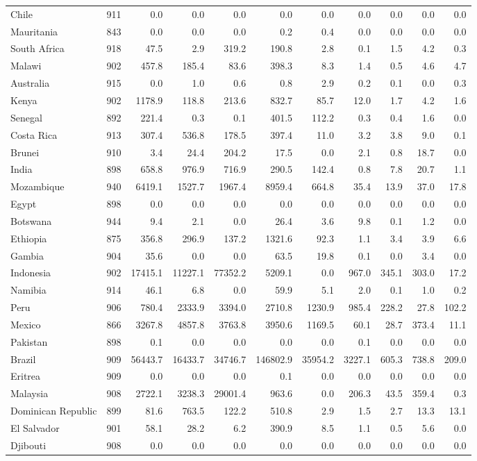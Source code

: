 \begin{center}
\begin{scriptsize}
\begin{longtable}[ht]{lrrrrrrrrrr}
			Chile&911&0.0&0.0&0.0&0.0&0.0&0.0&0.0&0.0&0.0\\
			Mauritania&843&0.0&0.0&0.0&0.2&0.4&0.0&0.0&0.0&0.0\\
			South Africa&918&47.5&2.9&319.2&190.8&2.8&0.1&1.5&4.2&0.3\\
			Malawi&902&457.8&185.4&83.6&398.3&8.3&1.4&0.5&4.6&4.7\\
			Australia&915&0.0&1.0&0.6&0.8&2.9&0.2&0.1&0.0&0.3\\
			Kenya&902&1178.9&118.8&213.6&832.7&85.7&12.0&1.7&4.2&1.6\\
			Senegal&892&221.4&0.3&0.1&401.5&112.2&0.3&0.4&1.6&0.0\\
			Costa Rica&913&307.4&536.8&178.5&397.4&11.0&3.2&3.8&9.0&0.1\\
			Brunei&910&3.4&24.4&204.2&17.5&0.0&2.1&0.8&18.7&0.0\\
			India&898&658.8&976.9&716.9&290.5&142.4&0.8&7.8&20.7&1.1\\
			Mozambique&940&6419.1&1527.7&1967.4&8959.4&664.8&35.4&13.9&37.0&17.8\\
			Egypt&898&0.0&0.0&0.0&0.0&0.0&0.0&0.0&0.0&0.0\\
			Botswana&944&9.4&2.1&0.0&26.4&3.6&9.8&0.1&1.2&0.0\\
			Ethiopia&875&356.8&296.9&137.2&1321.6&92.3&1.1&3.4&3.9&6.6\\
			Gambia&904&35.6&0.0&0.0&63.5&19.8&0.1&0.0&3.4&0.0\\
			Indonesia&902&17415.1&11227.1&77352.2&5209.1&0.0&967.0&345.1&303.0&17.2\\
			Namibia&914&46.1&6.8&0.0&59.9&5.1&2.0&0.1&1.0&0.2\\
			Peru&906&780.4&2333.9&3394.0&2710.8&1230.9&985.4&228.2&27.8&102.2\\
			Mexico&866&3267.8&4857.8&3763.8&3950.6&1169.5&60.1&28.7&373.4&11.1\\
			Pakistan&898&0.1&0.0&0.0&0.0&0.0&0.1&0.0&0.0&0.0\\
			Brazil&909&56443.7&16433.7&34746.7&146802.9&35954.2&3227.1&605.3&738.8&209.0\\
			Eritrea&909&0.0&0.0&0.0&0.1&0.0&0.0&0.0&0.0&0.0\\
			Malaysia&908&2722.1&3238.3&29001.4&963.6&0.0&206.3&43.5&359.4&0.3\\
			Dominican Republic&899&81.6&763.5&122.2&510.8&2.9&1.5&2.7&13.3&13.1\\
			El Salvador&901&58.1&28.2&6.2&390.9&8.5&1.1&0.5&5.6&0.0\\
			Djibouti&908&0.0&0.0&0.0&0.0&0.0&0.0&0.0&0.0&0.0\\

\end{longtable}
\end{scriptsize}
\end{center}
